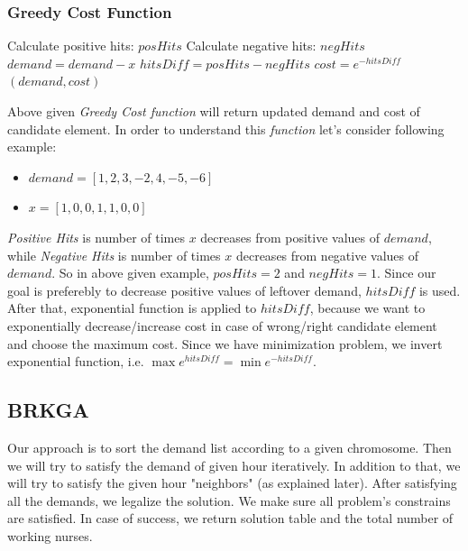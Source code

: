 \documentclass{article}
\newcommand\tab[1][1cm]{\hspace*{#1}}
\begin{document}
	\subsubsection{Greedy Cost Function}
	\begin{algorithmic}[1]
		\State Calculate positive hits: $posHits$
		\State Calculate negative hits: $negHits$
		\State $demand = demand-x$
		\State $hitsDiff = posHits - negHits$
		\State $cost = e^{-hitsDiff}$
		\State \Return $(demand, cost)$
	\EndFunction
	\end{algorithmic}
\tab Above given \textit{Greedy Cost function} will return updated demand and cost of candidate element. In order to understand this \textit{function} let's consider following example:
	\begin{itemize}
		\item $demand = [1,2,3,-2,4,-5,-6]$
		\item $x = [1,0,0,1,1,0,0]$
	\end{itemize}
\tab \textit{Positive Hits} is number of times $x$ decreases from positive values of $demand$, while \textit{Negative Hits} is number of times $x$ decreases from negative values of $demand.$ So in above given example, $posHits = 2$ and $negHits = 1.$ Since our goal is preferebly to decrease positive values of leftover demand, $hitsDiff$ is used. After that, exponential function is applied to $hitsDiff$, because we want to exponentially decrease/increase cost in case of wrong/right candidate element and choose the maximum cost. Since we have minimization problem, we invert exponential function, i.e. $\max e^{hitsDiff} = \min e^{-hitsDiff}$. 
	\subsection{BRKGA}
	\tab Our approach is to sort the demand list according to a given chromosome. Then we will try to satisfy the demand of given hour iteratively. In addition to that, we will try to satisfy the given hour "neighbors" (as explained later). After satisfying all the demands, we legalize the solution. We make sure all problem's constrains are satisfied. In case of success, we return solution table and the total number of working nurses.
\end{document}
